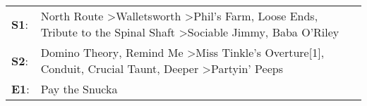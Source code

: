 \begin{supertabular}{p{0.03\textwidth}p{0.92\textwidth}}
 \textbf{S1}:  &  North Route\textsuperscript{} \textgreater \enspace Walletsworth\textsuperscript{} \textgreater \enspace Phil's Farm\textsuperscript{}, \enspace Loose Ends\textsuperscript{}, \enspace Tribute to the Spinal Shaft\textsuperscript{} \textgreater \enspace Sociable Jimmy\textsuperscript{}, \enspace Baba O'Riley\textsuperscript{}  \enspace  \\
 \textbf{S2}:  &                        Domino Theory\textsuperscript{}, \enspace Remind Me\textsuperscript{} \textgreater \enspace Miss Tinkle's Overture[1]\textsuperscript{}, \enspace Conduit\textsuperscript{}, \enspace Crucial Taunt\textsuperscript{}, \enspace Deeper\textsuperscript{} \textgreater \enspace Partyin' Peeps\textsuperscript{}  \enspace  \\
 \textbf{E1}:  &                                                                                                                                                                                                                                                                                                       Pay the Snucka\textsuperscript{}  \enspace  \\
\end{supertabular}
